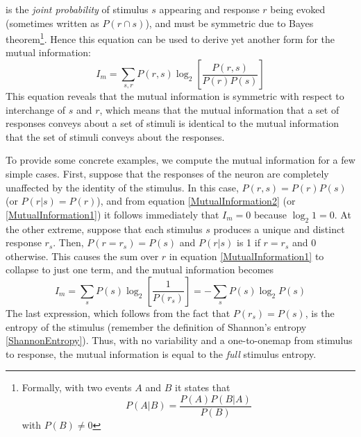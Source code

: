 is the \emph{joint probability} of stimulus $s$ appearing and response $r$ being evoked (sometimes written as $P(r\cap s)$), and must be symmetric due to Bayes theorem\footnote{Formally, with two events $A$ and $B$ it states that
\begin{equation}
P(A|B)=\frac{P(A)P(B|A)}{P(B)}
\end{equation}
with $P(B)\neq0$}. Hence this equation can be used to derive yet another form for the mutual information:
\begin{equation}\label{MutualInformation2}
\boxed{I_m=\sum_{s,r}P(r,s)\log_{2}{\left[\frac{P(r,s)}{P(r)P(s)}\right]}}
\end{equation}
This equation reveals that the mutual information is symmetric with respect to interchange of $s$ and $r$, which means that the mutual information that a set of responses conveys about a set of stimuli is identical to the mutual information that the set of stimuli conveys about the responses.

To provide some concrete examples, we compute the mutual information for a few simple cases. First, suppose that the responses of the neuron are completely unaffected by the identity of the stimulus. In this case, $P(r,s)=P(r)P(s)$ (or $P(r|s)=P(r)$), and from equation \eqref{MutualInformation2} (or \eqref{MutualInformation1}) it follows immediately that $I_m=0$ because $\log_2{1}=0$. At the other extreme, suppose that each stimulus $s$ produces a unique and distinct response $r_s$. Then, $P(r=r_s)=P(s)$ and $P(r|s)$ is 1 if $r=r_s$ and 0 otherwise. This causes the sum over $r$ in equation \eqref{MutualInformation1} to collapse to just one term, and the mutual information becomes
\begin{equation}
I_m=\sum_{s}P(s)\log_{2}{\left[\frac{1}{P(r_s)}\right]}=-\sum_sP(s)\log_{2}{P(s)}
\end{equation}
The last expression, which follows from the fact that $P(r_s)=P(s)$, is the entropy of the stimulus (remember the definition of Shannon's entropy \eqref{ShannonEntropy}). Thus, with no variability and a one-to-onemap from stimulus to response, the mutual information is equal to the \emph{full} stimulus entropy.

